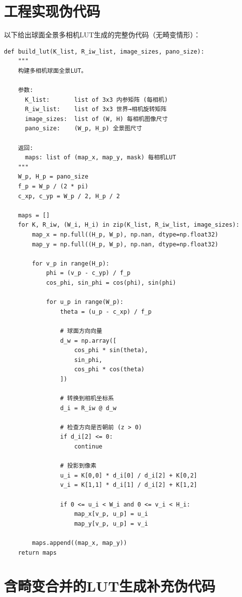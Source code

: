 \section{工程实现伪代码}
\label{apx:pseudocode}

以下给出球面全景多相机LUT生成的完整伪代码（无畸变情形）：

\begin{verbatim}
def build_lut(K_list, R_iw_list, image_sizes, pano_size):
    """
    构建多相机球面全景LUT。

    参数:
      K_list:       list of 3x3 内参矩阵 (每相机)
      R_iw_list:    list of 3x3 世界→相机旋转矩阵
      image_sizes:  list of (W, H) 每相机图像尺寸
      pano_size:    (W_p, H_p) 全景图尺寸

    返回:
      maps: list of (map_x, map_y, mask) 每相机LUT
    """
    W_p, H_p = pano_size
    f_p = W_p / (2 * pi)
    c_xp, c_yp = W_p / 2, H_p / 2

    maps = []
    for K, R_iw, (W_i, H_i) in zip(K_list, R_iw_list, image_sizes):
        map_x = np.full((H_p, W_p), np.nan, dtype=np.float32)
        map_y = np.full((H_p, W_p), np.nan, dtype=np.float32)

        for v_p in range(H_p):
            phi = (v_p - c_yp) / f_p
            cos_phi, sin_phi = cos(phi), sin(phi)

            for u_p in range(W_p):
                theta = (u_p - c_xp) / f_p

                # 球面方向向量
                d_w = np.array([
                    cos_phi * sin(theta),
                    sin_phi,
                    cos_phi * cos(theta)
                ])

                # 转换到相机坐标系
                d_i = R_iw @ d_w

                # 检查方向是否朝前 (z > 0)
                if d_i[2] <= 0:
                    continue

                # 投影到像素
                u_i = K[0,0] * d_i[0] / d_i[2] + K[0,2]
                v_i = K[1,1] * d_i[1] / d_i[2] + K[1,2]

                if 0 <= u_i < W_i and 0 <= v_i < H_i:
                    map_x[v_p, u_p] = u_i
                    map_y[v_p, u_p] = v_i

        maps.append((map_x, map_y))
    return maps
\end{verbatim}

\section{含畸变合并的LUT生成补充伪代码}
\label{apx:pseudocode-dist}

